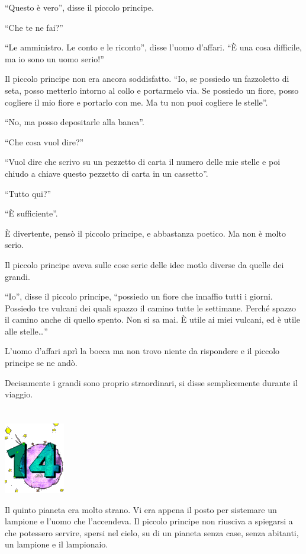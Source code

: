 \documentclass[11pt]{scrbook}
\begin{document}
``Questo è vero'', disse il piccolo principe.

``Che te ne fai?''

``Le amministro. Le conto e le riconto'', disse l'uomo d'affari. ``È una
cosa difficile, ma io sono un uomo serio!''

Il piccolo principe non era ancora soddisfatto.
``Io, se possiedo un fazzoletto di seta, posso metterlo intorno al collo e
portarmelo via. Se possiedo un fiore, posso cogliere il mio fiore
e portarlo con me. Ma tu non puoi cogliere le stelle''.

``No, ma posso depositarle alla banca''.

``Che cosa vuol dire?''

``Vuol dire che scrivo su un pezzetto di carta il numero delle mie
stelle e poi chiudo a chiave questo pezzetto di carta in un cassetto''.

``Tutto qui?''

``È sufficiente''.

È divertente, pensò il piccolo principe, e abbastanza poetico. Ma non è
molto serio.

Il piccolo principe aveva sulle cose serie delle idee motlo diverse da
quelle dei grandi.

``Io'', disse il piccolo principe, ``possiedo un fiore che innaffio
tutti i giorni. Possiedo tre vulcani dei quali spazzo il camino tutte le
settimane. Perché spazzo il camino anche di quello spento. Non si sa
mai. È utile ai miei vulcani, ed è utile alle stelle\ldots{}''

L'uomo d'affari aprì la bocca ma non trovo niente da rispondere e il
piccolo principe se ne andò.

Decisamente i grandi sono proprio straordinari, si disse semplicemente
durante il viaggio.

\chapter{}
\begin{center}
\includegraphics{img/chapter14}
\end{center}

Il quinto pianeta era molto strano. Vi era appena il posto per sistemare
un lampione e l'uomo che l'accendeva. Il piccolo principe non riusciva a
spiegarsi a che potessero servire, spersi nel cielo, su di un pianeta
senza case, senza abitanti, un lampione e il lampionaio.
\end{document}
